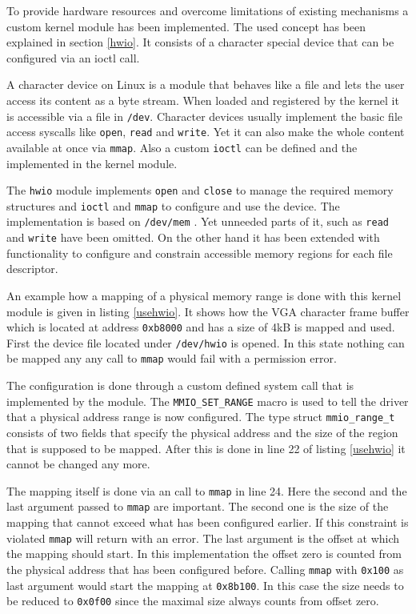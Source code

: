 \documentclass[
a4paper,
12pt,
notitlepage,
parskip=half,
DIV=11,
]{scrbook}
\begin{document}
		To provide hardware resources and overcome limitations of existing mechanisms a custom kernel module has been implemented.
		The used concept has been explained in section \ref{hwio}.
		It consists of a character special device that can be configured via an ioctl call.
		
		A character device on Linux is a module that behaves like a file and lets the user access its content as a byte stream.
		When loaded and registered by the kernel it is accessible via a file in \texttt{/dev}.
		Character devices usually implement the basic file access syscalls like \texttt{open}, \texttt{read} and \texttt{write}.
		Yet it can also make the whole content available at once via \texttt{mmap}.
		Also a custom \texttt{ioctl} can be defined and the implemented in the kernel module. \citep{books/daglib/0012446}
		
		The \texttt{hwio} module implements \texttt{open} and \texttt{close} to manage the required memory structures and \texttt{ioctl} and \texttt{mmap} to configure and use the device.
		The implementation is based on \texttt{/dev/mem} \citep{devmem}.
		Yet unneeded parts of it, such as \texttt{read} and \texttt{write} have been omitted.
		On the other hand it has been extended with functionality to configure and constrain accessible memory regions for each file descriptor.
		
		
		An example how a mapping of a physical memory range is done with this kernel module is given in listing \ref{usehwio}.
		It shows how the VGA character frame buffer which is located at address \texttt{0xb8000} and has a size of 4kB is mapped and used.
		First the device file located under \texttt{/dev/hwio} is opened.
		In this state nothing can be mapped any any call to \texttt{mmap} would fail with a permission error.
		
		The configuration is done through a custom defined system call that is implemented by the module.
		The \texttt{MMIO\_SET\_RANGE} macro is used to tell the driver that a physical address range is now configured.
		The type struct \texttt{mmio\_range\_t} consists of two fields that specify the physical address and the size of the region that is supposed to be mapped.
		After this is done in line 22 of listing \ref{usehwio} it cannot be changed any more.
		
		The mapping itself is done via an call to \texttt{mmap} in line 24.
		Here the second and the last argument passed to \texttt{mmap} are important.
		The second one is the size of the mapping that cannot exceed what has been configured earlier.
		If this constraint is violated \texttt{mmap} will return with an error.
		The last argument is the offset at which the mapping should start.
		In this implementation the offset zero is counted from the physical address that has been configured before.
		Calling \texttt{mmap} with \texttt{0x100} as last argument would start the mapping at \texttt{0x8b100}.
		In this case the size needs to be reduced to \texttt{0x0f00} since the maximal size always counts from offset zero.
		
\end{document}
